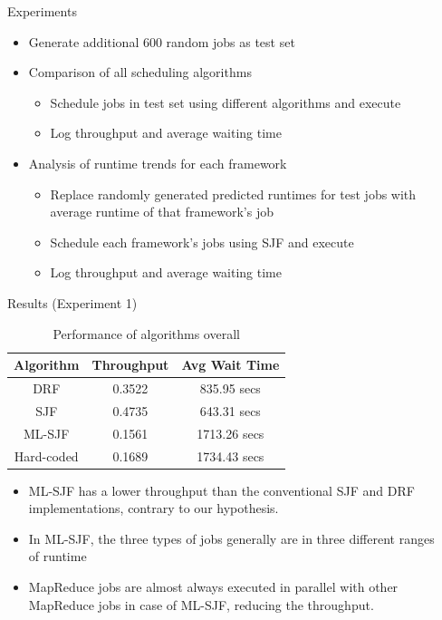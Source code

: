 \documentclass[unknownkeysallowed, final]{beamer}
\begin{document}
\begin{frame}
\begin{columns}[t]
\begin{column}{.34\linewidth}
\end{column}
\begin{column}{.29\linewidth}
\begin{block}{Experiments}	
\begin{itemize}
	\item Generate additional 600 random jobs as test set
	\item Comparison of all scheduling algorithms
	\begin{itemize}
		\item Schedule jobs in test set using different algorithms and execute
		\item Log throughput and average waiting time
	\end{itemize}
	\item Analysis of runtime trends for each framework
	\begin{itemize}
	    \item Replace randomly generated predicted runtimes for test jobs with average runtime of that framework's job
	    \item Schedule each framework's jobs using SJF and execute
	    \item Log throughput and average waiting time
	\end{itemize}
\end{itemize}
\end{block}
\vspace{.16cm}
\begin{block}{Results (Experiment 1)}

\begin{table}[!tbh]
\centering
\begin{tabular}{|c|c|c|}
    \hline
    \textbf{Algorithm} & \textbf{Throughput} & \textbf{Avg Wait Time} \\\hline
    DRF & 0.3522 & 835.95 secs \\\hline
    SJF & 0.4735 & 643.31 secs \\\hline
    ML-SJF & 0.1561 & 1713.26 secs \\\hline
    Hard-coded & 0.1689 & 1734.43 secs \\\hline
\end{tabular}
\caption{Performance of algorithms overall}
\label{all-jobs}
\end{table}
\begin{itemize}
	\item ML-SJF has a lower throughput than the conventional SJF and DRF implementations, contrary to our hypothesis.
	\item In ML-SJF, the three types of jobs generally are in three different ranges of runtime
	\item MapReduce jobs are almost always executed in parallel with other MapReduce jobs in case of ML-SJF, reducing the throughput. 
\end{itemize}
\vspace{-.4cm}
\end{block}


\end{column}
\end{columns}
\end{frame}
\end{document}
